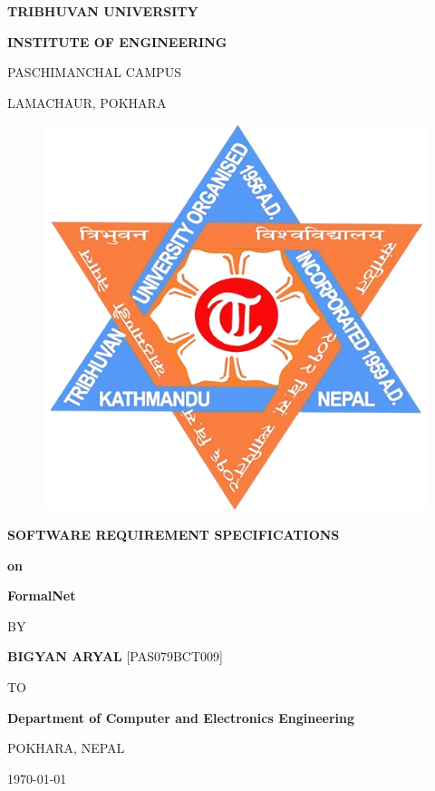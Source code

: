 \begin{titlepage}
    \thispagestyle{empty}
    \begin{center}
    
    \vspace*{\fill} %
    {\large \textbf{TRIBHUVAN UNIVERSITY
}\par}
{\large \textbf{INSTITUTE OF ENGINEERING
}\par}
\vspace{8pt}
PASCHIMANCHAL CAMPUS

LAMACHAUR, POKHARA
\vspace{24pt}

\begin{figure}[ht]
    \centering
    \includegraphics[scale=0.25]{../images/ioe-logo.png}
\end{figure}
\vspace{24pt}
{\textbf{SOFTWARE REQUIREMENT SPECIFICATIONS}\par \textbf{on} \par}
\vspace{14pt}
{\textbf{ FormalNet }\par}

\vspace{14pt}
{BY\par}
\vspace{14pt}
    
{\textbf{BIGYAN ARYAL} [PAS079BCT009]\par}

\vspace{24pt}
{TO\par}
\vspace{14pt}
{\textbf{Department of Computer and
Electronics Engineering}\par}
{POKHARA, NEPAL\par}
\today
    \vspace*{\fill}

    \end{center}
\end{titlepage}